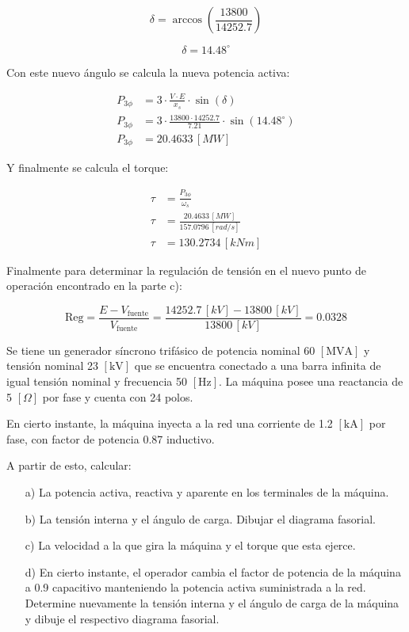\documentclass[
  11pt,
  letterpaper,
   addpoints,
   answers
  ]{exam}
\begin{document}
\begin{questions}
\begin{solution}
\[
\delta = \arccos \left( \frac{13800}{14252.7} \right)
\]

\[
\delta = 14.48^\circ
\]

Con este nuevo ángulo se calcula la nueva potencia activa:

\begin{align}
P_{3\phi} &= 3 \cdot \frac{V \cdot E}{x_s} \cdot \sin(\delta) \\
P_{3\phi} &= 3 \cdot \frac{13800 \cdot 14252.7}{7.21} \cdot \sin(14.48^\circ) \\
P_{3\phi} &= 20.4633 \, [MW]
\end{align}

Y finalmente se calcula el torque:

\begin{align}
\tau &= \frac{P_{3\phi}}{\omega_s} \\
\tau &= \frac{20.4633 \, [MW]}{157.0796 \, [rad/s]} \\
\tau &= 130.2734 \, [kNm]
\end{align}

Finalmente para determinar la regulación de tensión en el nuevo punto de operación encontrado en la parte c):

\[
\text{Reg} = \frac{E - V_{\text{fuente}}}{V_{\text{fuente}}} = \frac{14252.7 \, [kV] - 13800 \, [kV]}{13800 \, [kV]} = 0.0328
\]
    \end{solution}
    \question Se tiene un generador síncrono trifásico de potencia nominal 60 $[\text{MVA}]$ y tensión nominal 23 $[\text{kV}]$ que se encuentra conectado a una barra infinita de igual tensión nominal y frecuencia 50 $[\text{Hz}]$. La máquina posee una reactancia de 5 $[\Omega]$ por fase y cuenta con 24 polos.

    En cierto instante, la máquina inyecta a la red una corriente de 1.2 $[\text{kA}]$ por fase, con factor de potencia 0.87 inductivo.
    
    A partir de esto, calcular:
    
    \begin{enumerate}
        \item[a)] La potencia activa, reactiva y aparente en los terminales de la máquina.
        \item[b)] La tensión interna y el ángulo de carga. Dibujar el diagrama fasorial.
        \item[c)] La velocidad a la que gira la máquina y el torque que esta ejerce.
        \item[d)] En cierto instante, el operador cambia el factor de potencia de la máquina a 0.9 capacitivo manteniendo la potencia activa suministrada a la red. Determine nuevamente la tensión interna y el ángulo de carga de la máquina y dibuje el respectivo diagrama fasorial.
    \end{enumerate}
\begin{solution}

\end{solution}
\end{questions}
\end{document}
